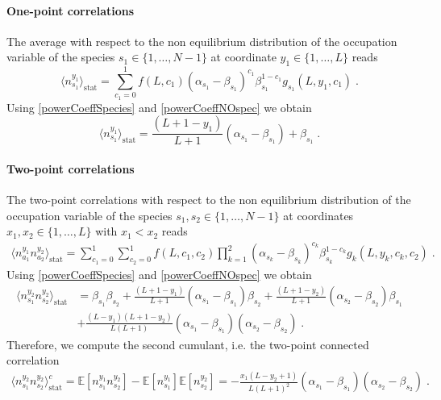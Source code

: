\documentclass[10pt]{article}
\numberwithin{equation}{section}
\numberwithin{equation}{subsection}
\newcommand{\dt}{\;.}
\begin{document}
\paragraph{One-point correlations}
The average with respect to the non equilibrium distribution of the occupation variable of the species $s_{1}\in \{1,\ldots,N-1\}$ at coordinate $y_{1}\in \{1,\ldots,L\}$ reads
\begin{equation}
	\langle n_{s_{1}}^{y_{1}}\rangle_{\text{stat}}=\sum_{c_{1}=0}^{1}f(L,c_{1})(\alpha_{s_{1}}-\beta_{s_{1}})^{c_{1}}\beta_{s_{1}}^{1-c_{1}}g_{s_{1}}(L,y_{1},c_{1})\dt
\end{equation}
Using \eqref{powerCoeffSpecies} and \eqref{powerCoeffNOspec} we obtain 
\begin{equation}\label{one-pts-corr}
\langle n_{s_{1}}^{y_{1}}\rangle_{\text{stat}}=\frac{(L+1-y_{1})}{L+1}(\alpha_{s_{1}}-\beta_{s_{1}})+\beta_{s_{1}}\dt
\end{equation}
\paragraph{Two-point correlations}
The two-point correlations with respect to the non equilibrium distribution of the occupation variable of the species $s_{1},s_{2}\in \{1,\ldots,N-1\}$ at coordinates $x_{1},x_{2}\in \{1,\ldots,L\}$ with $x_{1}< x_{2}$ reads 
\begin{equation}
	\begin{split}
	\langle n_{a_{1}}^{y_{1}}n_{a_{2}}^{y_{2}}\rangle_{\text{stat}}= \sum_{c_{1}=0}^{1}\sum_{c_{2}=0}^{1}f(L,c_{1},c_{2})\prod_{k=1}^{2}(\alpha_{s_{k}}-\beta_{s_{k}})^{c_{k}}\beta_{s_{k}}^{1-c_{k}}g_{k}(L,y_{k},c_{k},c_{2})\dt
	\end{split}
\end{equation}
Using \eqref{powerCoeffSpecies} and \eqref{powerCoeffNOspec} we obtain 
\begin{equation}
	\begin{split}
	\langle n_{s_{1}}^{y_{2}} n_{s_{2}}^{y_{2}}\rangle_{\text{stat}}&=\beta_{s_{1}}\beta_{s_{2}}+\frac{(L+1-y_{1})}{L+1}(\alpha_{s_{1}}-\beta_{s_{1}})\beta_{s_{2}}+\frac{(L+1-y_{2})}{L+1}(\alpha_{s_{2}}-\beta_{s_{2}})\beta_{s_{1}}\\&+\frac{(L-y_{1})(L+1-y_{2})}{L(L+1)}(\alpha_{s_{1}}-\beta_{s_{1}})(\alpha_{s_{2}}-\beta_{s_{2}})\dt
	\end{split}
\end{equation}
Therefore, we compute the second cumulant, i.e. the two-point connected correlation
\begin{equation}\label{two-pts-corr}
	\begin{split}
		\langle n_{s_{1}}^{y_{2}} n_{s_{2}}^{y_{2}}\rangle_{\text{stat}}^{c}=\mathbb{E}[n_{s_{1}}^{y_{1}}n_{s_{2}}^{y_{2}}]-\mathbb{E}[n_{s_{1}}^{y_{1}}]\mathbb{E}[n_{s_{2}}^{y_{2}}]=-\frac{x_{1}(L-y_{2}+1)}{L(L+1)^{2}}\left(\alpha_{s_{1}}-\beta_{s_{1}}\right)\left(\alpha_{s_{2}}-\beta_{s_{2}}\right)\dt
	\end{split}
\end{equation}
\end{document}
